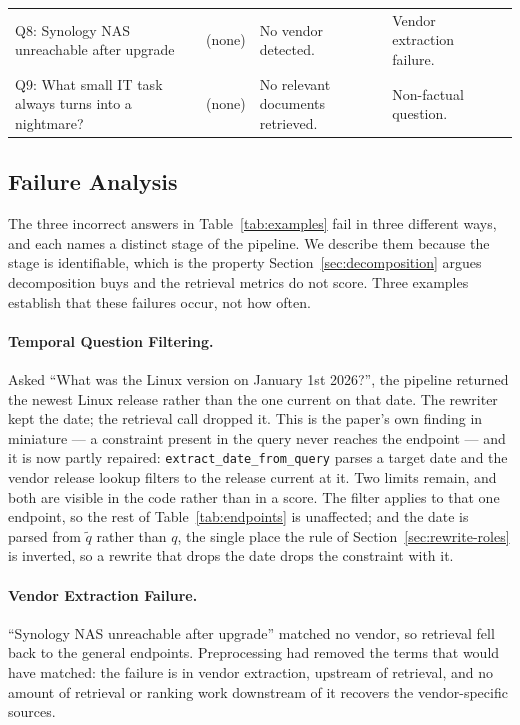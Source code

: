 \documentclass[acmsmall,review,anonymous,screen]{acmart}
\begin{document}
\begin{table}[t]
\begin{tabular}{@{}R{0.245\textwidth}R{0.125\textwidth}R{0.295\textwidth}R{0.175\textwidth}R{0.05\textwidth}@{}}
Q8: Synology NAS unreachable after upgrade
   & (none)
   & No vendor detected.
   & Vendor extraction failure.
   & \textcolor{red!70!black}{\textbf{}} \\

Q9: What small IT task always turns into a nightmare?
   & (none)
   & No relevant documents retrieved.
   & Non-factual question.
   & \textcolor{red!70!black}{\textbf{}} \\
\bottomrule
\end{tabular}
\end{table}

\subsection{Failure Analysis}

The three incorrect answers in Table~\ref{tab:examples} fail in three
different ways, and each names a distinct stage of the pipeline. We describe
them because the stage is identifiable, which is the property
Section~\ref{sec:decomposition} argues decomposition buys and the retrieval
metrics do not score. Three examples establish that these failures occur, not
how often.

\paragraph{Temporal Question Filtering.}
Asked ``What was the Linux version on January 1st 2026?'', the pipeline
returned the newest Linux release rather than the one current on that date. The
rewriter kept the date; the retrieval call dropped it. This is the paper's own
finding in miniature --- a constraint present in the query never reaches the
endpoint --- and it is now partly repaired: \texttt{extract\_date\_from\_query}
parses a target date and the vendor release lookup filters to the release
current at it. Two limits remain, and both are visible in the code rather than
in a score. The filter applies to that one endpoint, so the rest of
Table~\ref{tab:endpoints} is unaffected; and the date is parsed from $\tilde{q}$ rather than $q$, the single
place the rule of Section~\ref{sec:rewrite-roles} is inverted, so a rewrite
that drops the date drops the constraint with it.

\paragraph{Vendor Extraction Failure.}
``Synology NAS unreachable after upgrade'' matched no vendor, so retrieval
fell back to the general endpoints. Preprocessing had removed the terms that
would have matched: the failure is in vendor extraction, upstream of retrieval,
and no amount of retrieval or ranking work downstream of it recovers the
vendor-specific sources.
\end{document}
